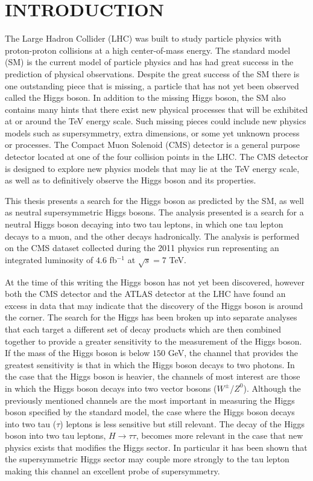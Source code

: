 \chapter{INTRODUCTION}
The Large Hadron Collider (LHC) was built to study particle physics with proton-proton collisions at a high center-of-mass energy.
The standard model (SM) is the current model of particle physics and has had great success in the prediction of physical observations.
Despite the great success of the SM there is one outstanding piece that is missing, a particle that has not yet been observed called the Higgs boson.
In addition to the missing Higgs boson, the SM also contains many hints that there exist new physical processes that will be exhibited at or around the TeV energy scale.
Such missing pieces could include new physics models such as supersymmetry, extra dimensions, or some yet unknown process or processes.
The Compact Muon Solenoid (CMS) detector is a general purpose detector located at one of the four collision points in the LHC.
The CMS detector is designed to explore new physics models that may lie at the TeV energy scale, as well as to definitively observe the Higgs boson and its properties.

This thesis presents a search for the Higgs boson as predicted by the SM, as well as neutral supersymmetric Higgs bosons.
The analysis presented is a search for a neutral Higgs boson decaying into two tau leptons, in which one tau lepton decays to a muon, and the other decays hadronically.
The analysis is performed on the CMS dataset collected during the 2011 physics run representing an integrated luminosity of $4.6$ fb$^{-1}$ at $\sqrt{s} = 7$ TeV.

At the time of this writing the Higgs boson has not yet been discovered, however both the CMS detector and the ATLAS detector at the LHC have found an excess in data that may indicate that the discovery of the Higgs boson is around the corner.
The search for the Higgs has been broken up into separate analyses that each target a different set of decay products which are then combined together to provide a greater sensitivity to the measurement of the Higgs boson.
If the mass of the Higgs boson is below $150$ GeV, the channel that provides the greatest sensitivity is that in which the Higgs boson decays to two photons.
In the case that the Higgs boson is heavier, the channels of most interest are those in which the Higgs boson decays into two vector bosons ($W^{\pm}$/$Z^{0}$). 
Although the previously mentioned channels are the most important in measuring the Higgs boson specified by the standard model, the case where the Higgs boson decays into two tau ($\tau$) leptons is less sensitive but still relevant.
The decay of the Higgs boson into two tau leptons, $H\rightarrow\tau\tau$, becomes more relevant in the case that new physics exists that modifies the Higgs sector.
In particular it has been shown that the supersymmetric Higgs sector may couple more strongly to the tau lepton making this channel an excellent probe of supersymmetry.


